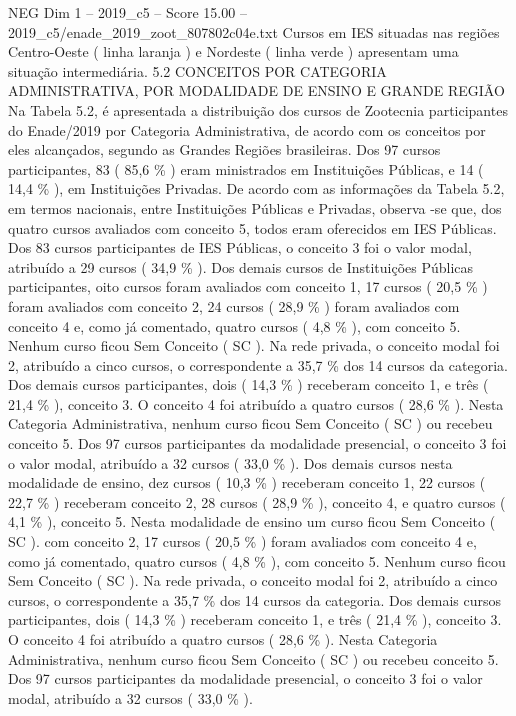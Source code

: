 \begin{textsample}{NEG Dim 1 – 2019\_c5 – Score 15.00 – 2019\_c5/enade\_2019\_zoot\_807802c04e.txt}
Cursos em IES situadas nas regiões Centro-Oeste ( linha laranja ) e Nordeste ( linha verde ) apresentam uma situação intermediária. 5.2 CONCEITOS POR CATEGORIA ADMINISTRATIVA, POR MODALIDADE DE ENSINO E GRANDE REGIÃO Na Tabela 5.2, é apresentada a distribuição dos cursos de Zootecnia participantes do Enade/2019 por Categoria Administrativa, de acordo com os conceitos por eles alcançados, segundo as Grandes Regiões brasileiras.
Dos 97 cursos participantes, 83 ( 85,6 \% ) eram ministrados em Instituições Públicas, e 14 ( 14,4 \% ), em Instituições Privadas.
De acordo com as informações da Tabela 5.2, em termos nacionais, entre Instituições Públicas e Privadas, observa -se que, dos quatro cursos avaliados com conceito 5, todos eram oferecidos em IES Públicas.
Dos 83 cursos participantes de IES Públicas, o conceito 3 foi o valor modal, atribuído a 29 cursos ( 34,9 \% ).
Dos demais cursos de Instituições Públicas participantes, oito cursos foram avaliados com conceito 1, 17 cursos ( 20,5 \% ) foram avaliados com conceito 2, 24 cursos ( 28,9 \% ) foram avaliados com conceito 4 e, como já comentado, quatro cursos ( 4,8 \% ), com conceito 5.
Nenhum curso ficou Sem Conceito ( SC ).
Na rede privada, o conceito modal foi 2, atribuído a cinco cursos, o correspondente a 35,7 \% dos 14 cursos da categoria.
Dos demais cursos participantes, dois ( 14,3 \% ) receberam conceito 1, e três ( 21,4 \% ), conceito 3.
O conceito 4 foi atribuído a quatro cursos ( 28,6 \% ).
Nesta Categoria Administrativa, nenhum curso ficou Sem Conceito ( SC ) ou recebeu conceito 5.
Dos 97 cursos participantes da modalidade presencial, o conceito 3 foi o valor modal, atribuído a 32 cursos ( 33,0 \% ).
Dos demais cursos nesta modalidade de ensino, dez cursos ( 10,3 \% ) receberam conceito 1, 22 cursos ( 22,7 \% ) receberam conceito 2, 28 cursos ( 28,9 \% ), conceito 4, e quatro cursos ( 4,1 \% ), conceito 5.
Nesta modalidade de ensino um curso ficou Sem Conceito ( SC ). com conceito 2, 17 cursos ( 20,5 \% ) foram avaliados com conceito 4 e, como já comentado, quatro cursos ( 4,8 \% ), com conceito 5.
Nenhum curso ficou Sem Conceito ( SC ).
Na rede privada, o conceito modal foi 2, atribuído a cinco cursos, o correspondente a 35,7 \% dos 14 cursos da categoria.
Dos demais cursos participantes, dois ( 14,3 \% ) receberam conceito 1, e três ( 21,4 \% ), conceito 3.
O conceito 4 foi atribuído a quatro cursos ( 28,6 \% ).
Nesta Categoria Administrativa, nenhum curso ficou Sem Conceito ( SC ) ou recebeu conceito 5.
Dos 97 cursos participantes da modalidade presencial, o conceito 3 foi o valor modal, atribuído a 32 cursos ( 33,0 \% ).

\end{textsample}
